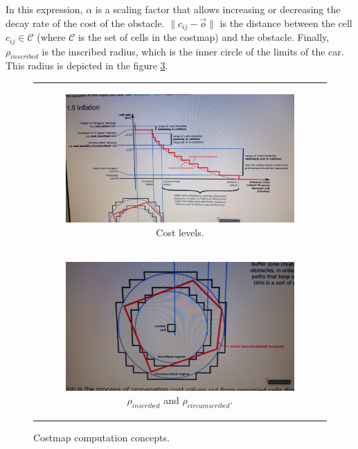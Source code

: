 In this expression, $\alpha$ is a scaling factor that allows increasing or decreasing the decay rate of the cost of the obstacle. $\|c_{ij}-\vec{o}\|$ is the distance between the cell $c_{ij} \in \mathcal{C}$ (where $\mathcal{C}$ is the set of cells in the costmap) and the obstacle. Finally, $\rho_{inscribed}$ is the inscribed radius, which is the inner circle of the limits of the car. This radius is depicted in the figure \ref{fig:cp07_costmap_concepts}.

\begin{figure}[h!]
\begin{tabular}{c}
  \begin{subfigure}[b]{\textwidth}
    \centering
    \includegraphics[width=\textwidth]{cost_levels}
    \caption{Cost levels.}
    \label{fig:cp07_cost_levels}
  \end{subfigure}\\ 
  \begin{subfigure}[b]{\textwidth}
    \centering
    \includegraphics[width=\textwidth]{inscribed_circumscribed}
    \caption{$\rho_{inscribed}$ and $\rho_{circumscribed}$.}
    \label{fig:cp07_inscribed_circumscribed}
  \end{subfigure}
\end{tabular}
\caption{Costmap computation concepts.}\label{fig:cp07_costmap_concepts}
\end{figure}

